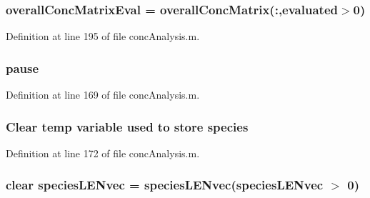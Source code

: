 \hypertarget{a00025_ad9fb43d1f2f660ac0e99cc638e5ac774}{
\subsubsection[{overall\-Conc\-Matrix\-Eval}]{\setlength{\rightskip}{0pt plus 5cm}overall\-Conc\-Matrix\-Eval = {\bf overall\-Conc\-Matrix}(\-:,{\bf evaluated}$>$0)}}\label{a00025_ad9fb43d1f2f660ac0e99cc638e5ac774}


Definition at line 195 of file conc\-Analysis.\-m.

\hypertarget{a00025_afd7d49e17b69bd6bf3d7a649856c1067}{
\subsubsection[{pause}]{\setlength{\rightskip}{0pt plus 5cm}pause}}\label{a00025_afd7d49e17b69bd6bf3d7a649856c1067}


Definition at line 169 of file conc\-Analysis.\-m.

\hypertarget{a00025_a0e465545a27eaf9ca2c9710f744963c4}{
\subsubsection[{species}]{\setlength{\rightskip}{0pt plus 5cm}Clear temp variable used {\bf to} store {\bf species}}}\label{a00025_a0e465545a27eaf9ca2c9710f744963c4}


Definition at line 172 of file conc\-Analysis.\-m.

\hypertarget{a00025_a728fdfd72d1bd5110134afd6e09e99da}{
\subsubsection[{species\-L\-E\-Nvec}]{\setlength{\rightskip}{0pt plus 5cm}clear species\-L\-E\-Nvec = species\-L\-E\-Nvec(species\-L\-E\-Nvec $>$ 0)}}\label{a00025_a728fdfd72d1bd5110134afd6e09e99da}


